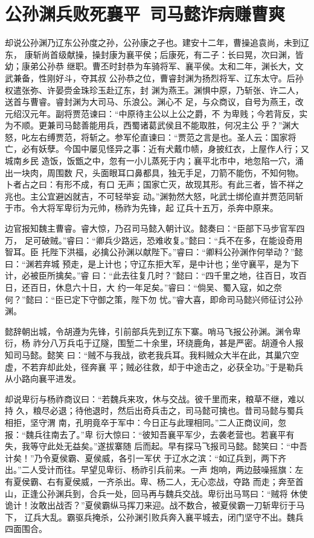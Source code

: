 \chapter{公孙渊兵败死襄平~司马懿诈病赚曹爽}

却说公孙渊乃辽东公孙度之孙，公孙康之子也。建安十二年，曹操追袁尚，未到辽东，
康斩尚首级献操，操封康为襄平侯；后康死，有二子：长曰晃，次曰渊，皆幼；康弟公孙恭
继职。曹丕时封恭为车骑将军、襄平侯。太和二年，渊长大，文武兼备，性刚好斗，夺其叔
公孙恭之位，曹睿封渊为扬烈将军、辽东太守。后孙权遣张弥、许晏赍金珠珍玉赴辽东，封
渊为燕王。渊惧中原，乃斩张、许二人，送首与曹睿。睿封渊为大司马、乐浪公。渊心不
足，与众商议，自号为燕王，改元绍汉元年。副将贾范谏曰：“中原待主公以上公之爵，不
为卑贱；今若背反，实为不顺。更兼司马懿善能用兵，西蜀诸葛武侯且不能取胜，何况主公
乎？”渊大怒，叱左右缚贾范，将斩之。参军伦直谏曰：“贾范之言是也。圣人云：国家将
亡，必有妖孽。今国中屡见怪异之事：近有犬戴巾帻，身披红衣，上屋作人行；又城南乡民
造饭，饭甑之中，忽有一小儿蒸死于内；襄平北市中，地忽陷一穴，涌出一块肉，周围数
尺，头面眼耳口鼻都具，独无手足，刀箭不能伤，不知何物。卜者占之曰：有形不成，有口
无声；国家亡灭，故现其形。有此三者，皆不祥之兆也。主公宜避凶就吉，不可轻举妄
动。”渊勃然大怒，叱武士绑伦直并贾范同斩于市。令大将军卑衍为元帅，杨祚为先锋，起
辽兵十五万，杀奔中原来。

边官报知魏主曹睿。睿大惊，乃召司马懿入朝计议。懿奏曰：“臣部下马步官军四万，
足可破贼。”睿曰：“卿兵少路远，恐难收复。”懿曰：“兵不在多，在能设奇用智耳。臣
托陛下洪福，必擒公孙渊以献陛下。”睿曰：“卿料公孙渊作何举动？”懿曰：“渊若弃城
预走，是上计也；守辽东拒大军，是中计也；坐守襄平，是为下计，必被臣所擒矣。”睿
曰：“此去往复几时？”懿曰：“四千里之地，往百日，攻百日，还百日，休息六十日，大
约一年足矣。”睿曰：“倘吴、蜀入寇，如之奈何？”懿曰：“臣已定下守御之策，陛下勿
忧。”睿大喜，即命司马懿兴师征讨公孙渊。

懿辞朝出城，令胡遵为先锋，引前部兵先到辽东下寨。哨马飞报公孙渊。渊令卑衍，杨
祚分八万兵屯于辽隧，围堑二十余里，环绕鹿角，甚是严密。胡遵令人报知司马懿。懿笑
曰：“贼不与我战，欲老我兵耳。我料贼众大半在此，其巢穴空虚，不若弃却此处，径奔襄
平；贼必往救，却于中途击之，必获全功。”于是勒兵从小路向襄平进发。

却说卑衍与杨祚商议曰：“若魏兵来攻，休与交战。彼千里而来，粮草不继，难以持
久，粮尽必退；待他退时，然后出奇兵击之，司马懿可擒也。昔司马懿与蜀兵相拒，坚守渭
南，孔明竟卒于军中：今日正与此理相同。”二人正商议间，忽报：“魏兵往南去了。”卑
衍大惊曰：“彼知吾襄平军少，去袭老营也。若襄平有失，我等守此处无益矣。”遂拔寨随
后而起。早有探马飞报司马懿。懿笑曰：“中吾计矣！”乃令夏侯霸、夏侯威，各引一军伏
于辽水之滨：“如辽兵到，两下齐出。”二人受计而往。早望见卑衍、杨祚引兵前来。一声
炮响，两边鼓噪摇旗：左有夏侯霸、右有夏侯威，一齐杀出。卑、杨二人，无心恋战，夺路
而走；奔至首山，正逢公孙渊兵到，合兵一处，回马再与魏兵交战。卑衍出马骂曰：“贼将
休使诡计！汝敢出战否？”夏侯霸纵马挥刀来迎。战不数合，被夏侯霸一刀斩卑衍于马下，
辽兵大乱。霸驱兵掩杀，公孙渊引败兵奔入襄平城去，闭门坚守不出。魏兵四面围合。

